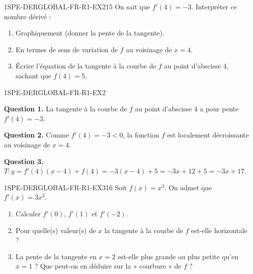 
\begin{exercice}{1SPE-DERGLOBAL-FR-R1-EX2}{1}{5}
On sait que $f'(4) = -3$. Interpréter ce nombre dérivé :
\begin{enumerate}
  \item Graphiquement (donner la pente de la tangente).
  \item En termes de sens de variation de $f$ au voisinage de $x = 4$.
  \item Écrire l'équation de la tangente à la courbe de $f$ au point d'abscisse $4$, sachant que $f(4) = 5$.
\end{enumerate}
\end{exercice}


\begin{corrige}{1SPE-DERGLOBAL-FR-R1-EX2}

\textbf{Question 1.}
La tangente à la courbe de $f$ au point d'abscisse $4$ a pour pente $f'(4) = -3$.

\textbf{Question 2.}
Comme $f'(4) = -3 < 0$, la fonction $f$ est localement décroissante au voisinage de $x = 4$.

\textbf{Question 3.}
$T : y = f'(4)(x - 4) + f(4) = -3(x - 4) + 5 = -3x + 12 + 5 = -3x + 17.$

\end{corrige}


\begin{exercice}{1SPE-DERGLOBAL-FR-R1-EX3}{1}{6}
Soit $f(x) = x^3$. On admet que $f'(x) = 3x^2$.
\begin{enumerate}
  \item Calculer $f'(0)$, $f'(1)$ et $f'(-2)$.
  \item Pour quelle(s) valeur(s) de $x$ la tangente à la courbe de $f$ est-elle horizontale ?
  \item La pente de la tangente en $x = 2$ est-elle plus grande ou plus petite qu'en $x = 1$ ? Que peut-on en déduire sur la « courbure » de $f$ ?
\end{enumerate}
\end{exercice}


